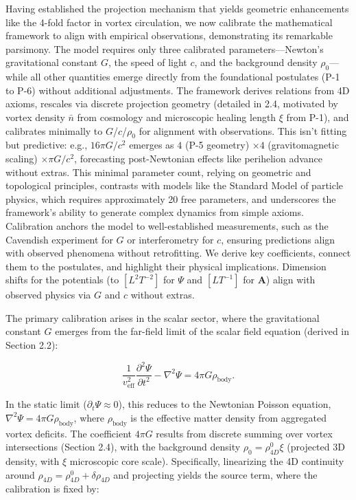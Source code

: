 Having established the projection mechanism that yields geometric enhancements like the 4-fold factor in vortex circulation, we now calibrate the mathematical framework to align with empirical observations, demonstrating its remarkable parsimony. The model requires only three calibrated parameters---Newton's gravitational constant $G$, the speed of light $c$, and the background density $\rho_0$---while all other quantities emerge directly from the foundational postulates (P-1 to P-6) without additional adjustments. The framework derives relations from 4D axioms, rescales via discrete projection geometry (detailed in 2.4, motivated by vortex density $\bar{n}$ from cosmology and microscopic healing length $\xi$ from P-1), and calibrates minimally to $G$/$c$/$\rho_0$ for alignment with observations. This isn't fitting but predictive: e.g., $16\pi G/c^2$ emerges as $4$ (P-5 geometry) $\times 4$ (gravitomagnetic scaling) $\times \pi G/c^2$, forecasting post-Newtonian effects like perihelion advance without extras. This minimal parameter count, relying on geometric and topological principles, contrasts with models like the Standard Model of particle physics, which requires approximately 20 free parameters, and underscores the framework's ability to generate complex dynamics from simple axioms. Calibration anchors the model to well-established measurements, such as the Cavendish experiment for $G$ or interferometry for $c$, ensuring predictions align with observed phenomena without retrofitting. We derive key coefficients, connect them to the postulates, and highlight their physical implications. Dimension shifts for the potentials (to $[L^2 T^{-2}]$ for $\Psi$ and $[L T^{-1}]$ for $\mathbf{A}$) align with observed physics via $G$ and $c$ without extras.

The primary calibration arises in the scalar sector, where the gravitational constant $G$ emerges from the far-field limit of the scalar field equation (derived in Section 2.2):

\[
\frac{1}{v_{\text{eff}}^2} \frac{\partial^2 \Psi}{\partial t^2} - \nabla^2 \Psi = 4\pi G \rho_{\text{body}}.
\]

In the static limit ($\partial_t \Psi \approx 0$), this reduces to the Newtonian Poisson equation, $\nabla^2 \Psi = 4\pi G \rho_{\text{body}}$, where $\rho_{\text{body}}$ is the effective matter density from aggregated vortex deficits. The coefficient $4\pi G$ results from discrete summing over vortex intersections (Section 2.4), with the background density $\rho_0 = \rho_{4D}^0 \xi$ (projected 3D density, with $\xi$ microscopic core scale). Specifically, linearizing the 4D continuity around $\rho_{4D} = \rho_{4D}^0 + \delta \rho_{4D}$ and projecting yields the source term, where the calibration is fixed by:

